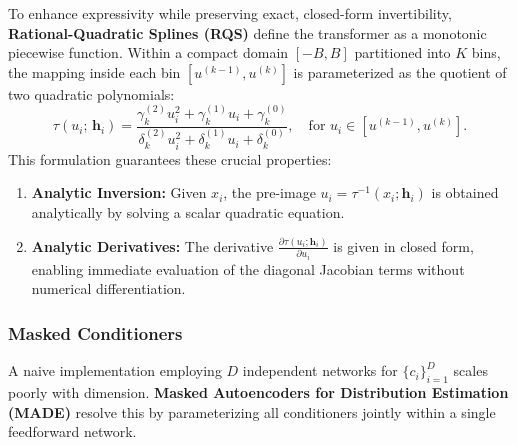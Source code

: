 \documentclass[12pt]{article}
\renewcommand{\vec}[1]{\boldsymbol{\mathbf{#1}}}
\begin{document}
        To enhance expressivity while preserving exact, closed-form invertibility, \textbf{Rational-Quadratic Splines (RQS)} define the transformer as a monotonic piecewise function. Within a compact domain $[-B, B]$ partitioned into $K$ bins, the mapping inside each bin $[u^{(k-1)}, u^{(k)}]$ is parameterized as the quotient of two quadratic polynomials:
        \begin{equation}
            \tau(u_i; \, \vec{h}_i) = \frac{\gamma^{(2)}_k u_i^2 + \gamma^{(1)}_k u_i + \gamma^{(0)}_k}{\delta^{(2)}_k u_i^2 + \delta^{(1)}_k u_i + \delta^{(0)}_k}, \quad \text{for } u_i \in [u^{(k-1)}, u^{(k)}].
        \end{equation}
        This formulation guarantees these crucial properties:
        \begin{enumerate}
            \item \textbf{Analytic Inversion:} Given $x_i$, the pre-image $u_i = \tau^{-1}(x_i; \vec{h}_i)$ is obtained analytically by solving a scalar quadratic equation.
            \item \textbf{Analytic Derivatives:} The derivative $\frac{\partial \tau(u_i; \vec{h}_i)}{\partial u_i}$ is given in closed form, enabling immediate evaluation of the diagonal Jacobian terms without numerical differentiation.
        \end{enumerate}

        \subsubsection{Masked Conditioners}
        A naive implementation employing $D$ independent networks for $\{c_i\}_{i=1}^D$ scales poorly with dimension. \textbf{Masked Autoencoders for Distribution Estimation (MADE)} resolve this by parameterizing all conditioners jointly within a single feedforward network.
\end{document}
